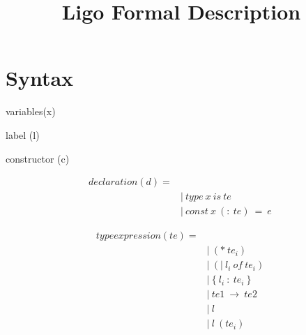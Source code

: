 \documentclass[10pt,a4paper]{article}
\title{Ligo Formal Description}
\begin{document}
\maketitle
\section*{ Syntax }

variables(x)

label (l)

constructor (c)

\begin{align*}
declaration(d) = 
\\
 \ &|\ type\ x\ is\ te                \ \tag{Type\ declaration}
\\
 \ &|\ const\ x\ (:\ te)\ =\ e          \ \tag{Const\ declaration}
\end{align*}

\begin{align*}
type expression(te) =
\\
 \ &|\ (*\ te_i)                    \ \tag{Type\ tuple}
\\
 \ &|\ (|\ l_i\ of\ te_i)             \ \tag{Type\ sum}
\\
 \ &|\ \{\ l_i\ :\ te_i\ \}              \ \tag{Type\ record}
\\
 \ &|\ te1\ \rightarrow \ te2                  \ \tag{function}
\\
 \ &|\ l                           \ \tag{variable}
\\
 \ &|\ l\ (te_i)                    \ \tag{type\ of\ built\ in\ function}
\end{align*}
\end{document}

